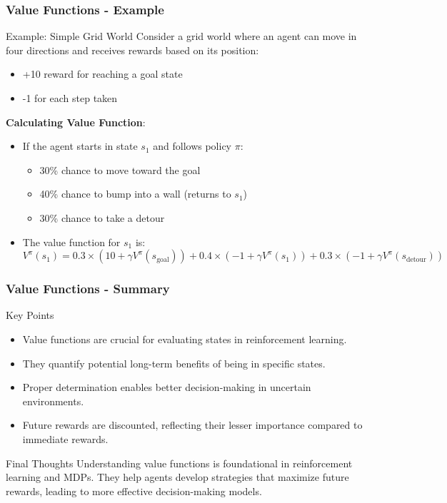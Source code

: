 \documentclass[aspectratio=169]{beamer}
\begin{document}
\begin{frame}[fragile]
    \frametitle{Value Functions - Example}
    \begin{block}{Example: Simple Grid World}
        Consider a grid world where an agent can move in four directions and receives rewards based on its position:
        \begin{itemize}
            \item +10 reward for reaching a goal state
            \item -1 for each step taken
        \end{itemize}
        
        \textbf{Calculating Value Function}:
        
        \begin{itemize}
            \item If the agent starts in state \(s_1\) and follows policy \(\pi\):
            \begin{itemize}
                \item 30\% chance to move toward the goal
                \item 40\% chance to bump into a wall (returns to \(s_1\))
                \item 30\% chance to take a detour
            \end{itemize}
            \item The value function for \(s_1\) is:
            \[
            V^\pi(s_1) = 0.3 \times \left( 10 + \gamma V^\pi(s_{\text{goal}}) \right) + 0.4 \times \left( -1 + \gamma V^\pi(s_1) \right) + 0.3 \times \left( -1 + \gamma V^\pi(s_{\text{detour}}) \right)
            \]
        \end{itemize}
    \end{block}
\end{frame}

\begin{frame}[fragile]
    \frametitle{Value Functions - Summary}
    \begin{block}{Key Points}
        \begin{itemize}
            \item Value functions are crucial for evaluating states in reinforcement learning.
            \item They quantify potential long-term benefits of being in specific states.
            \item Proper determination enables better decision-making in uncertain environments.
            \item Future rewards are discounted, reflecting their lesser importance compared to immediate rewards.
        \end{itemize}
    \end{block}

    \begin{block}{Final Thoughts}
        Understanding value functions is foundational in reinforcement learning and MDPs. They help agents develop strategies that maximize future rewards, leading to more effective decision-making models.
    \end{block}
\end{frame}
\end{document}
